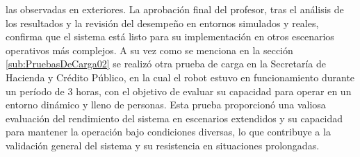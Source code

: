         las observadas en exteriores.
    \vskip 0.5cm
    La aprobaci\'on final del profesor, tras el an\'alisis de los resultados y la revisi\'on del desempe\~no en entornos 
        simulados y reales, confirma que el sistema est\'a listo para su implementaci\'on en otros escenarios 
        operativos m\'as complejos.
    \vskip 0.5cm
    A su vez como se menciona en la secci\'on \ref{sub:PruebasDeCarga02} se realiz\'o otra prueba de carga en la 
        Secretar\'ia de Hacienda y Cr\'edito P\'ublico, en la cual el robot estuvo en funcionamiento durante un 
        per\'iodo de 3 horas, con el objetivo de evaluar su capacidad para operar en un entorno din\'amico y lleno 
        de personas. Esta prueba proporcion\'o una valiosa evaluaci\'on del rendimiento del sistema en escenarios 
        extendidos y su capacidad para mantener la operaci\'on bajo condiciones diversas, lo que contribuye a la 
        validaci\'on general del sistema y su resistencia en situaciones prolongadas.
